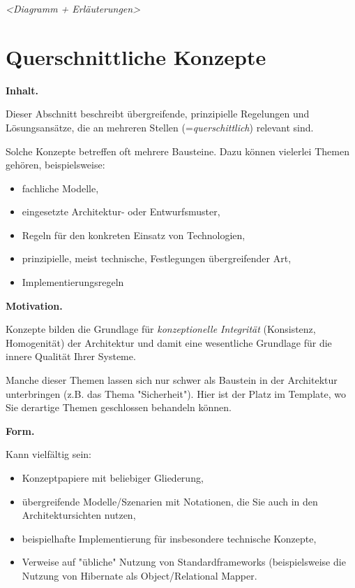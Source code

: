 \documentclass[]{article}
\begin{document}
\emph{\textless{}Diagramm + Erläuterungen\textgreater{}}

\section{Querschnittliche Konzepte}\label{section-concepts}

\textbf{Inhalt.}

Dieser Abschnitt beschreibt übergreifende, prinzipielle Regelungen und
Lösungsansätze, die an mehreren Stellen (=\emph{querschittlich})
relevant sind.

Solche Konzepte betreffen oft mehrere Bausteine. Dazu können vielerlei
Themen gehören, beispielsweise:

\begin{itemize}
\item
  fachliche Modelle,
\item
  eingesetzte Architektur- oder Entwurfsmuster,
\item
  Regeln für den konkreten Einsatz von Technologien,
\item
  prinzipielle, meist technische, Festlegungen übergreifender Art,
\item
  Implementierungsregeln
\end{itemize}

\textbf{Motivation.}

Konzepte bilden die Grundlage für \emph{konzeptionelle Integrität}
(Konsistenz, Homogenität) der Architektur und damit eine wesentliche
Grundlage für die innere Qualität Ihrer Systeme.

Manche dieser Themen lassen sich nur schwer als Baustein in der
Architektur unterbringen (z.B. das Thema "Sicherheit"). Hier ist der
Platz im Template, wo Sie derartige Themen geschlossen behandeln können.

\textbf{Form.}

Kann vielfältig sein:

\begin{itemize}
\item
  Konzeptpapiere mit beliebiger Gliederung,
\item
  übergreifende Modelle/Szenarien mit Notationen, die Sie auch in den
  Architektursichten nutzen,
\item
  beispielhafte Implementierung für insbesondere technische Konzepte,
\item
  Verweise auf "übliche" Nutzung von Standardframeworks (beispielsweise
  die Nutzung von Hibernate als Object/Relational Mapper.
\end{itemize}
\end{document}
